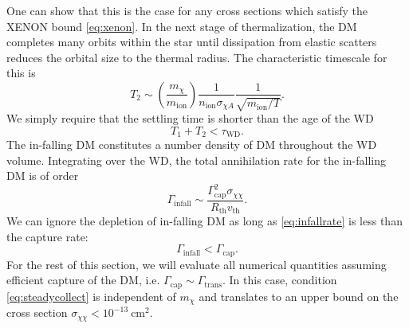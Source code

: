\documentclass[preprintnumbers,amsmath,amssymb,prd,superscriptaddress]{revtex4}
\newcommand{\GeV}{\text{GeV}}
\def\r{\right)}
\def\l{\left(}
\begin{document}
One can show that this is the case for any cross sections which satisfy the XENON bound \eqref{eq:xenon}. 
In the next stage of thermalization, the DM completes many orbits within the star until dissipation from elastic scatters reduces the orbital size to the thermal radius.
The characteristic timescale for this is
\begin{equation}
T_2 \sim \l \frac{m_\chi}{m_\text{ion}} \r \frac{1}{n_\text{ion} \sigma_{\chi A}} \frac{1}{\sqrt{m_\text{ion}/T}}. 
\end{equation}
We simply require that the settling time is shorter than the age of the WD
\begin{equation}
T_1 + T_2 < \tau_\text{WD}.
\end{equation}
The in-falling DM constitutes a number density of DM throughout the WD volume.
Integrating over the WD, the total annihilation rate for the in-falling DM is of order
\begin{equation}
\label{eq:infallrate}
\Gamma_\text{infall} \sim \frac{\Gamma_\text{cap}^2 \sigma_{\chi \chi}}{R_\text{th} v_\text{th}}.
\end{equation}
We can ignore the depletion of in-falling DM as long as \eqref{eq:infallrate} is less than the capture rate:
\begin{equation}
\label{eq:steadycollect}
\Gamma_\text{infall} < \Gamma_\text{cap}.
\end{equation}
For the rest of this section, we will evaluate all numerical quantities assuming efficient capture of the DM, i.e. $\Gamma_\text{cap} \sim \Gamma_\text{trans}$. 
In this case, condition \eqref{eq:steadycollect} is independent of $m_\chi$ and translates to an upper bound on the cross section $\sigma_{\chi \chi} < 10^{-13} ~\text{cm}^2$. 
\end{document}
